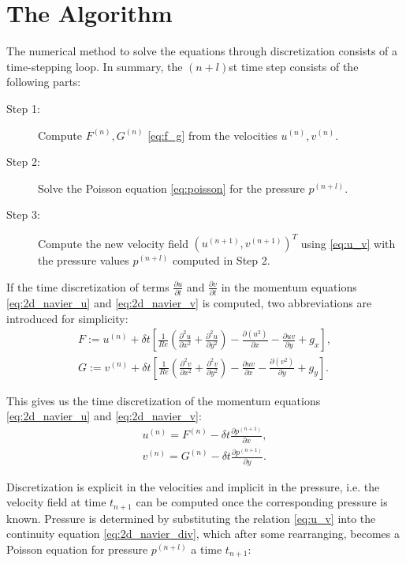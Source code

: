 \section{The Algorithm}
The numerical method to solve the equations through discretization consists of a time-stepping loop. In summary, the $(n + l)$st time step consists of the following parts:
\begin{description}
\item[Step 1:] Compute $F^{(n)}, G^{(n)}$ \ref{eq:f_g} from the velocities $u^{(n)}, v^{(n)}$.
\item[Step 2:] Solve the Poisson equation \ref{eq:poisson} for the pressure $p^{(n+l)}$.
\item[Step 3:] Compute the new velocity field $(u^{(n+1)}, v^{(n+1)})^T$ using \ref{eq:u_v} with the pressure values $p^{(n+l)}$ computed in Step 2.
\end{description}

If the time discretization of terms $\frac{\partial u}{\partial t}$ and $\frac{\partial v}{\partial t}$ in the momentum equations \ref{eq:2d_navier_u} and \ref{eq:2d_navier_v} is computed, two abbreviations are introduced for simplicity:
\begin{equation}
	\begin{array}{l} \label{eq:f_g}
		F := u^{(n)} + \delta t \left[ \frac{1}{Re} \left(\frac{\partial^2 u}{\partial x^2} + \frac{\partial^2 u}{\partial y^2}\right) - \frac{\partial (u^2)}{\partial x} - \frac{\partial uv}{\partial y} + g_x \right], \\
		G := v^{(n)} + \delta t \left[ \frac{1}{Re} \left(\frac{\partial^2 v}{\partial x^2} + \frac{\partial^2 v}{\partial y^2}\right) - \frac{\partial uv}{\partial x} - \frac{\partial (v^2)}{\partial y} + g_y \right].
	\end{array}
\end{equation}

This gives us the time discretization of the momentum equations \ref{eq:2d_navier_u} and \ref{eq:2d_navier_v}:
\begin{equation}  \label{eq:u_v}
	\begin{array}{l}
	 	u^{(n)} = F^{(n)} - \delta t \frac{\partial p^{(n+1)}}{\partial x}, \\
	 	v^{(n)} = G^{(n)} - \delta t \frac{\partial p^{(n+1)}}{\partial y}.
	\end{array}
\end{equation}

Discretization is explicit in the velocities and implicit in the pressure, i.e. the velocity field at time $t_{n+1}$ can be computed once the corresponding pressure is known. Pressure is determined by substituting the relation \ref{eq:u_v} into the continuity equation \ref{eq:2d_navier_div}, which after some rearranging, becomes a Poisson equation for pressure $p^{(n+l)}$ a time $t_{n+1}$:

